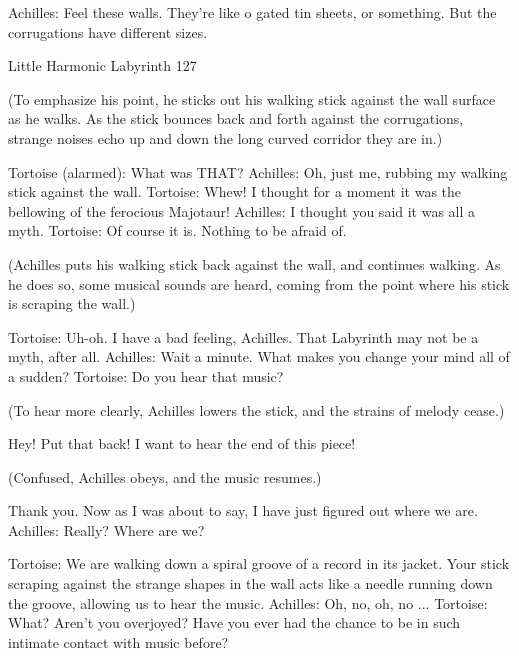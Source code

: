                Achilles: Feel these walls. They're like o gated tin sheets, or something.
                      But the corrugations have different sizes.




Little Harmonic Labyrinth                                                             127

                  (To emphasize his point, he sticks out his walking stick against the
                  wall surface as he walks. As the stick bounces back and forth against
                  the corrugations, strange noises echo up and down the long curved
                  corridor they are in.)

               Tortoise (alarmed): What was THAT?
               Achilles: Oh, just me, rubbing my walking stick against the wall.
               Tortoise: Whew! I thought for a moment it was the bellowing of the
                      ferocious Majotaur! Achilles: I thought you said it was all a
                      myth.
               Tortoise: Of course it is. Nothing to be afraid of.

                  (Achilles puts his walking stick back against the wall, and continues
                  walking. As he does so, some musical sounds are heard, coming from
                  the point where his stick is scraping the wall.)

               Tortoise: Uh-oh. I have a bad feeling, Achilles.
               That Labyrinth may not be a myth, after all. Achilles: Wait a minute.
                      What makes you change your mind all of a sudden? Tortoise: Do
                      you hear that music?

                  (To hear more clearly, Achilles lowers the stick, and the strains of
                  melody cease.)

                  Hey! Put that back! I want to hear the end of this piece!

                  (Confused, Achilles obeys, and the music resumes.)

                 Thank you. Now as I was about to say, I have just figured out where
               we are.
               Achilles: Really? Where are we?

               Tortoise: We are walking down a spiral groove of a record in its jacket.
                      Your stick scraping against the strange shapes in the wall acts
                      like a needle running down the groove, allowing us to hear the
                      music.
               Achilles: Oh, no, oh, no ...
               Tortoise: What? Aren't you overjoyed? Have you ever had the chance to
                      be in such intimate contact with music before?




